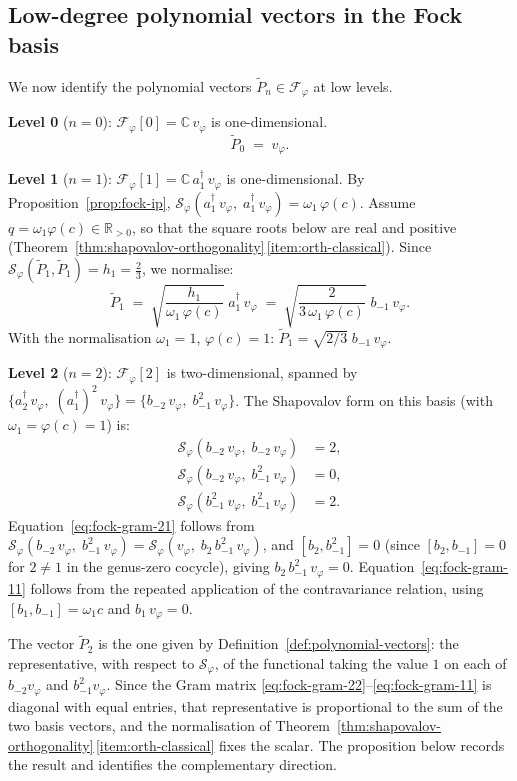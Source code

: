 \documentclass[12pt]{amsart}
\theoremstyle{plain}
\theoremstyle{definition}
\newcommand{\CC}{\mathbb{C}}
\newcommand{\RR}{\mathbb{R}}
\newcommand{\Sf}{\mathcal{S}_\varphi} %
\newcommand{\vf}{v_\varphi}           %
\begin{document}
\subsection{Low-degree polynomial vectors in the Fock basis}
\label{subsec:fock-lowdeg}

We now identify the polynomial vectors $\tilde{P}_n \in \mathcal{F}_\varphi$
at low levels.

\textbf{Level 0} ($n = 0$): $\mathcal{F}_\varphi[0] = \CC\,\vf$ is
one-dimensional.
\[
  \tilde{P}_0 \;=\; \vf.
\]

\textbf{Level 1} ($n = 1$): $\mathcal{F}_\varphi[1] = \CC\,a_1^\dagger\,\vf$
is one-dimensional.
By Proposition~\ref{prop:fock-ip},
$\Sf(a_1^\dagger\,\vf,\; a_1^\dagger\,\vf) = \omega_1\,\varphi(c)$.
Assume $q = \omega_1\varphi(c) \in \RR_{>0}$, so that the square roots
below are real and positive
(Theorem~\ref{thm:shapovalov-orthogonality}\,\ref{item:orth-classical}).
Since $\Sf(\tilde{P}_1,\tilde{P}_1) = h_1 = \frac{2}{3}$, we normalise:
\begin{equation}
\label{eq:P1-fock}
  \tilde{P}_1 \;=\; \sqrt{\frac{h_1}{\omega_1\,\varphi(c)}}\;
  a_1^\dagger\,\vf
  \;=\; \sqrt{\frac{2}{3\,\omega_1\,\varphi(c)}}\;
  b_{-1}\,\vf.
\end{equation}
With the normalisation $\omega_1 = 1$, $\varphi(c) = 1$:
$\tilde{P}_1 = \sqrt{2/3}\; b_{-1}\,\vf$.

\textbf{Level 2} ($n = 2$): $\mathcal{F}_\varphi[2]$ is two-dimensional,
spanned by $\bigl\{a_2^\dagger\,\vf,\; (a_1^\dagger)^2\,\vf\bigr\}
= \bigl\{b_{-2}\,\vf,\; b_{-1}^2\,\vf\bigr\}$.
The Shapovalov form on this basis (with $\omega_1 = \varphi(c) = 1$) is:
\begin{align}
  \Sf(b_{-2}\,\vf,\; b_{-2}\,\vf)
  &= 2, \label{eq:fock-gram-22}\\
  \Sf(b_{-2}\,\vf,\; b_{-1}^2\,\vf)
  &= 0, \label{eq:fock-gram-21}\\
  \Sf(b_{-1}^2\,\vf,\; b_{-1}^2\,\vf)
  &= 2. \label{eq:fock-gram-11}
\end{align}
Equation~\eqref{eq:fock-gram-21} follows from
$\Sf(b_{-2}\,\vf,\; b_{-1}^2\,\vf) = \Sf(\vf,\; b_2\,b_{-1}^2\,\vf)$,
and $[b_2, b_{-1}^2] = 0$ (since $[b_2,b_{-1}] = 0$ for $2 \neq 1$
in the genus-zero cocycle), giving $b_2\,b_{-1}^2\,\vf = 0$.
Equation~\eqref{eq:fock-gram-11} follows from the repeated application
of the contravariance relation, using $[b_1,b_{-1}] = \omega_1 c$
and $b_1\,\vf = 0$.

The vector $\tilde{P}_2$ is the one given by
Definition~\ref{def:polynomial-vectors}: the representative, with
respect to $\Sf$, of the functional taking the value $1$ on each of
$b_{-2}\vf$ and $b_{-1}^2\vf$. Since the Gram matrix
\eqref{eq:fock-gram-22}--\eqref{eq:fock-gram-11} is diagonal with equal
entries, that representative is proportional to the sum of the two
basis vectors, and the normalisation of
Theorem~\ref{thm:shapovalov-orthogonality}\,\ref{item:orth-classical}
fixes the scalar. The proposition below records the result and
identifies the complementary direction.
\end{document}
